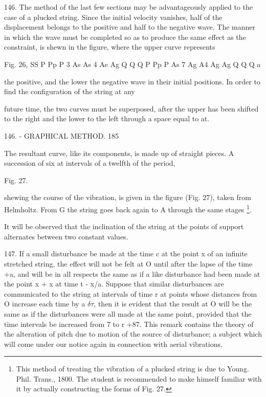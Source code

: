 146. The method of the last few sections may be advantageously applied
to the case of a plucked string. Since the initial velocity vanishes,
half of the displacement belongs to the positive and half to the
negative wave. The manner in which the wave must be completed so as to
produce the same effect as the constraint, is shewn in the figure, where
the upper curve represents

Fig. 26, SS P Pp P 3 As As 4 Ae Ag Q Q Q P Pp P As 7 Ag A4 Ag Ag Q Q Q a

the positive, and the lower the negative wave in their initial
positions. In order to find the configuration of the string at any

future time, the two curves must be superposed, after the upper has been
shifted to the right and the lower to the left through a space equal to
at.

146. - GRAPHICAL METHOD. 185

The resultant curve, like its components, is made up of straight pieces.
A succession of six at intervals of a twelfth of the period,

Fig. 27.

shewing the course of the vibration, is given in the figure (Fig. 27),
taken from Helmholtz. From G the string goes back again to A through the
same stages
\footnote{This method of treating the vibration of a plucked
string is due to Young. Phil. Trans., 1800. The student is recommended
to make himself familiar with it by actually constructing the forms of Fig. 27.}.

It will be observed that the inclination of the string at the points of
support alternates between two constant values.

147. If a small disturbance be made at the time c at the point x of an
infinite stretched string, the effect will not be felt at O until after
the lapse of the time +a, and will be in all respects the same as if a
like disturbance had been made at the point x + x at time t - x/a.
Suppose that similar disturbances are communicated to the string at
intervals of time r at points whose distances from O increase each time
by a \(\delta \tau\), then it is evident that the result at O will be
the same as if the disturbances were all made at the same point,
provided that the time intervals be increased from 7 to r +87. This
remark contains the theory of the alteration of pitch due to motion of
the source of disturbance; a subject which will come under our notice
again in connection with aerial vibrations.

